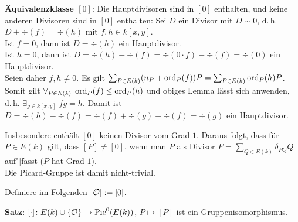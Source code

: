 \textbf{Äquivalenzklasse $[0]$}:
Die Hauptdivisoren sind in $[0]$ enthalten,
und keine anderen Divisoren sind in $[0]$ enthalten:
Sei $D$ ein Divisor mit $D \sim 0$, d.\,h. $D + \div(f) = \div(h)$ mit $f, h \in k[x, y]$.\\
Ist $f = 0$, dann ist $D = \div(h)$ ein Hauptdivisor.\\
Ist $h = 0$, dann ist $D = \div(h) - \div(f) = \div(0 \cdot f) - \div(f) = \div(0)$ ein
Hauptdivisor.\\
Seien daher $f, h \not= 0$.
Es gilt $\sum_{P \in E(k)} (n_P + \operatorname{ord}_P(f)) P = \sum_{P \in E(k)} \operatorname{ord}_P(h) P$.
Somit gilt $\forall_{P \in E(k)}\; \operatorname{ord}_P(f) \le \operatorname{ord}_P(h)$ und obiges Lemma lässt sich
anwenden, d.\,h. $\exists_{g \in k[x, y]}\; fg = h$.
Damit ist $D = \div(h) - \div(f) = \div(f) + \div(g) - \div(f) = \div(g)$ ein Hauptdivisor.

Insbesondere enthält $[0]$ keinen Divisor vom Grad $1$.
Daraus folgt, dass für $P \in E(k)$ gilt, dass $[P] \not= [0]$,
wenn man $P$ als Divisor $P = \sum_{Q \in E(k)} \delta_{PQ} Q$ auf"|fasst ($P$ hat Grad $1$).\\
Die Picard-Gruppe ist damit nicht-trivial.

\linie

Definiere im Folgenden $[\mathcal{O}] := [0]$.

\textbf{Satz}:
$[\cdot]\colon E(k) \cup \{\mathcal{O}\} \to \operatorname{Pic}^0(E(k))$, $P \mapsto [P]$
ist ein Gruppenisomorphismus.

